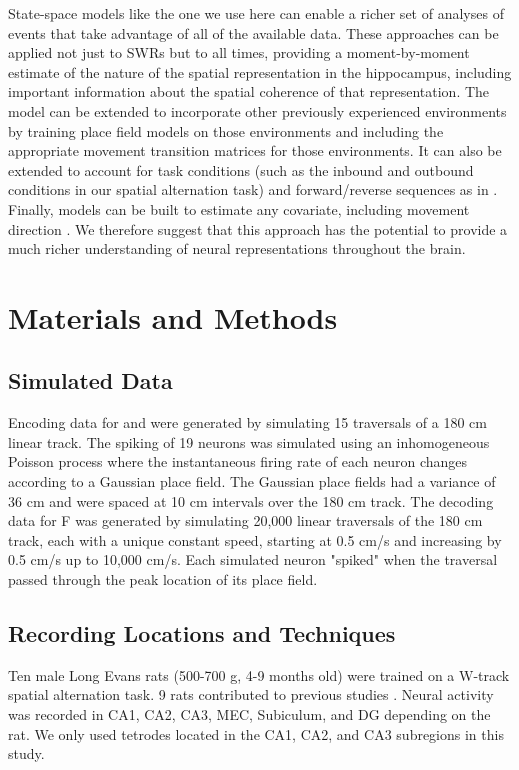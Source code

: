 \documentclass[9pt,lineno]{elife}
\begin{document}
State-space models like the one we use here can enable a richer set of analyses of events that take advantage of all of the available data. These approaches can be applied not just to SWRs but to all times, providing a moment-by-moment estimate of the nature of the spatial representation in the hippocampus, including important information about the spatial coherence of that representation. The model can be extended to incorporate other previously experienced environments by training place field models on those environments and including the appropriate movement transition matrices for those environments. It can also be extended to account for task conditions (such as the inbound and outbound conditions in our spatial alternation task) and forward/reverse sequences as in \cite{DengRapidclassificationhippocampal2016}. Finally, models can be built to estimate any covariate, including movement direction \citep{KayConstantSubsecondCycling2020}. We therefore suggest that this approach has the potential to provide a much richer understanding of neural representations throughout the brain. 

\section*{Materials and Methods}

\subsection*{Simulated Data}
Encoding data for  and  were generated by simulating 15 traversals of a 180 cm linear track. The spiking of 19 neurons was simulated using an inhomogeneous Poisson process where the instantaneous firing rate of each neuron changes according to a Gaussian place field. The Gaussian place fields had a variance of 36 cm and were spaced at 10 cm intervals over the 180 cm track. The decoding data for F was generated by simulating 20,000 linear traversals of the 180 cm track, each with a unique constant speed, starting at 0.5 cm/s and increasing by 0.5 cm/s up to 10,000 cm/s. Each simulated neuron "spiked" when the traversal passed through the peak location of its place field.

\subsection*{Recording Locations and Techniques}
Ten male Long Evans rats (500-700 g, 4-9 months old) were trained on a W-track spatial alternation task. 9 rats contributed to previous studies \citep{KarlssonAwakereplayremote2009, KayConstantSubsecondCycling2020, Kayhippocampalnetworkspatial2016, CarrTransientSlowGamma2012}. Neural activity was recorded in CA1, CA2, CA3, MEC, Subiculum, and DG depending on the rat. We only used tetrodes located in the CA1, CA2, and CA3 subregions in this study.
\end{document}
